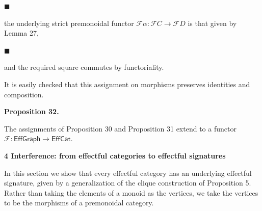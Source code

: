  
\par\noindent  $\blacksquare$ 
 
the underlying strict premonoidal functor $\mathcal{F}\alpha:\mathcal{F}C\to\mathcal{F}D$ is that given by Lemma 27,\par
 
 
 
\par\noindent  $\blacksquare$ 
 
and the required square commutes by functoriality.\par
 
 
  
 
 
 
It is easily checked that this assignment on morphisms preserves identities and composition.\par
 
 
 
\par\medskip\noindent\textbf{Proposition 32.}\par
 
 
The assignments of Proposition 30 and Proposition 31 extend to a functor $\mathscr{F}:\mathsf{EffGraph}\to\mathsf{EffCat}$.\par
 
 
 
 
 


 
\par\medskip\noindent\textbf{4 Interference: from effectful categories to effectful signatures}\par
 
 
In this section we show that every effectful category has an underlying effectful signature, given by a generalization of the clique construction of Proposition 5. Rather than taking the elements of a monoid as the vertices, we take the vertices to be the morphisms of a premonoidal category.\par
 
